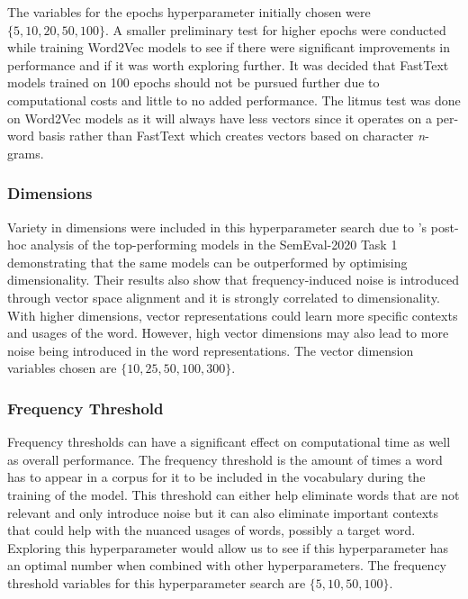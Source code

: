The variables for the epochs hyperparameter initially chosen were $\{5, 10, 20, 50, 100\}$. A smaller preliminary test for higher epochs were conducted while training Word2Vec models to see if there were significant improvements in performance and if it was worth exploring further. It was decided that FastText models trained on 100 epochs should not be pursued further due to computational costs and little to no added performance. The litmus test was done on Word2Vec models as it will always have less vectors since it operates on a per-word basis rather than FastText which creates vectors based on character \emph{n}-grams. 

\subsubsection{Dimensions}
\label{exp-dims}

Variety in dimensions were included in this hyperparameter search due to \citet{kaiser-etal-2020-ims}’s post-hoc analysis of the top-performing models in the SemEval-2020 Task 1 demonstrating that the same models can be outperformed by optimising dimensionality. Their results also show that frequency-induced noise is introduced through vector space alignment and it is strongly correlated to dimensionality. With higher dimensions, vector representations could learn more specific contexts and usages of the word. However, high vector dimensions may also lead to more noise being introduced in the word representations. The vector dimension variables chosen are $\{10, 25, 50, 100, 300\}$.

\subsubsection{Frequency Threshold}

Frequency thresholds can have a significant effect on computational time as well as overall performance. The frequency threshold is the amount of times a word has to appear in a corpus for it to be included in the vocabulary during the training of the model. This threshold can either help eliminate words that are not relevant and only introduce noise but it can also eliminate important contexts that could help with the nuanced usages of words, possibly a target word. Exploring this hyperparameter would allow us to see if this hyperparameter has an optimal number when combined with other hyperparameters. The frequency threshold variables for this hyperparameter search are $\{5, 10, 50, 100\}$.

